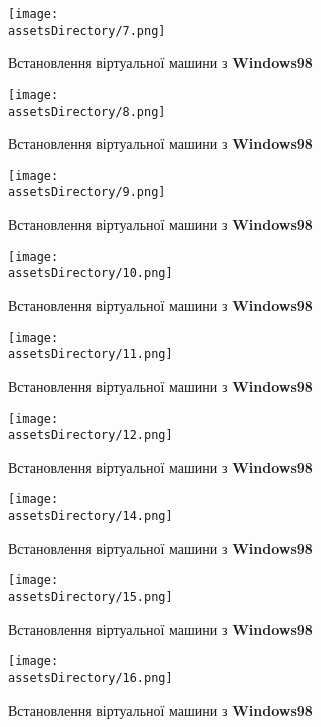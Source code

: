 \begin{figure}[ht!]
    \centering
    \texttt{[image: \\assetsDirectory/7.png]}
    \caption{Встановлення віртуальної машини з \textbf{Windows98}}
\end{figure}

\begin{figure}[ht!]
    \centering
    \texttt{[image: \\assetsDirectory/8.png]}
    \caption{Встановлення віртуальної машини з \textbf{Windows98}}
\end{figure}

\begin{figure}[ht!]
    \centering
    \texttt{[image: \\assetsDirectory/9.png]}
    \caption{Встановлення віртуальної машини з \textbf{Windows98}}
\end{figure}

\begin{figure}[ht!]
    \centering
    \texttt{[image: \\assetsDirectory/10.png]}
    \caption{Встановлення віртуальної машини з \textbf{Windows98}}
\end{figure}

\begin{figure}[ht!]
    \centering
    \texttt{[image: \\assetsDirectory/11.png]}
    \caption{Встановлення віртуальної машини з \textbf{Windows98}}
\end{figure}

\begin{figure}[ht!]
    \centering
    \texttt{[image: \\assetsDirectory/12.png]}
    \caption{Встановлення віртуальної машини з \textbf{Windows98}}
\end{figure}

\begin{figure}[ht!]
    \centering
    \texttt{[image: \\assetsDirectory/14.png]}
    \caption{Встановлення віртуальної машини з \textbf{Windows98}}
\end{figure}

\begin{figure}[ht!]
    \centering
    \texttt{[image: \\assetsDirectory/15.png]}
    \caption{Встановлення віртуальної машини з \textbf{Windows98}}
\end{figure}

\begin{figure}[ht!]
    \centering
    \texttt{[image: \\assetsDirectory/16.png]}
    \caption{Встановлення віртуальної машини з \textbf{Windows98}}
\end{figure}

